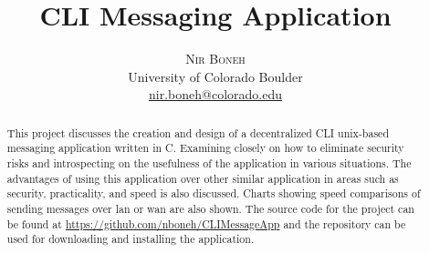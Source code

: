 \documentclass[twoside]{article}
\title{\vspace{-15mm}\fontsize{24pt}{10pt}\selectfont\textbf{CLI Messaging Application}} %
\author{
\large
\textsc{Nir Boneh}\\[2mm] %
\normalsize University of Colorado Boulder \\ %
\normalsize \href{mailto:nir.boneh@colorado.edu}{nir.boneh@colorado.edu} \\ %
\vspace{-5mm}
}
\date{}
\begin{document}
\maketitle %

\thispagestyle{fancy} %


\begin{abstract}

\noindent
This project discusses the creation and design of a decentralized CLI unix-based messaging application written in C. Examining 
closely on how to eliminate security risks and introspecting on the usefulness of the application in various situations. The 
advantages of using this application over other similar application in areas such as security, practicality, and speed is also 
discussed. Charts showing speed comparisons of sending messages over lan or wan are also shown. The source code for the project can be found at \href{https://github.com/nboneh/CLIMessageApp}{https://github.com/nboneh/CLIMessageApp} and the repository can be used for downloading and installing the application.

\end{abstract}

\end{document}
